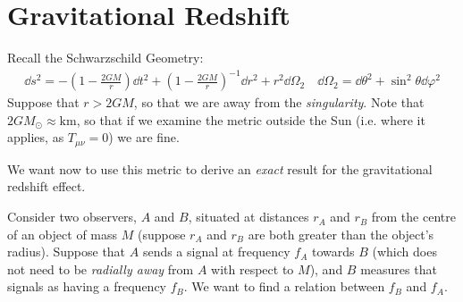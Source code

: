 \documentclass[../template.tex]{subfiles}
\begin{document}
\section{Gravitational Redshift}

Recall the Schwarzschild Geometry:
\begin{align*}
    \dd{s}^2 = - \left(1-\frac{2GM}{r} \right) \dd{t}^2 + \left(1-\frac{2GM}{r} \right)^{-1} \dd{r}^2 + r^2 \dd{\Omega_2} \quad \dd{\Omega_2} = \dd{\theta^2} + \sin^2 \theta \dd{\varphi}^2
\end{align*}
Suppose that $r > 2GM$, so that we are away from the \textit{singularity}. Note that $2 G M_{\odot} \approx \si{\kilo\m}$, so that if we examine the metric outside the Sun (i.e. where it applies, as $T_{\mu \nu} = 0$) we are fine.

We want now to use this metric to derive an \textit{exact} result for the gravitational redshift effect.

Consider two observers, $A$ and $B$, situated at distances $r_A$ and $r_B$ from the centre of an object of mass $M$ (suppose $r_A$ and $r_B$ are both greater than the object's radius). Suppose that $A$ sends a signal at frequency $f_A$ towards $B$ (which does not need to be \textit{radially away} from $A$ with respect to $M$), and $B$ measures that signals as having a frequency $f_B$. We want to find a relation between $f_B$ and $f_A$.
\end{document}
